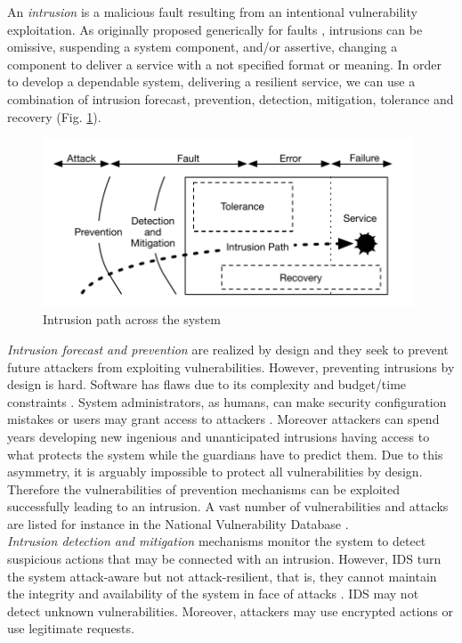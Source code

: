 An \emph{intrusion} is a malicious fault resulting from an intentional vulnerability exploitation. As originally proposed generically for faults \cite{Aviz,Powell1992}, intrusions can be omissive, suspending a system component, and/or assertive, changing a component to deliver a service with a not specified format or meaning. In order to develop a dependable system, delivering a resilient service, we can use a combination of intrusion forecast, prevention, detection, mitigation, tolerance and recovery (Fig. \ref{fig:intrusion_path}). \\

\begin{figure}
\centering
\includegraphics[width=110mm]{images/intrusion}
\caption{Intrusion path across the system}
\label{fig:intrusion_path}
\end{figure}

\emph{Intrusion forecast and prevention} are realized by design and they seek to prevent future attackers from exploiting vulnerabilities. However, preventing intrusions by design is hard. Software has flaws due to its complexity and budget/time constraints \cite{Charette2005,Landwehr1992}. System administrators, as humans, can make security configuration mistakes or users may grant access to attackers \cite{Brown2001}. Moreover attackers can spend years developing new ingenious and unanticipated intrusions having access to what protects the system while the guardians have to predict them. Due to this asymmetry, it is arguably impossible to protect all vulnerabilities by design. Therefore the vulnerabilities of prevention mechanisms can be exploited successfully leading to an intrusion. A vast number of vulnerabilities and attacks are listed for instance in the National Vulnerability Database \cite{nistNVD}.\\

\emph{Intrusion detection and mitigation} mechanisms monitor the system to detect suspicious actions that may be connected with an intrusion. However, \acf{IDS} turn the system attack-aware but not attack-resilient, that is, they cannot maintain the integrity and availability of the system in face of attacks \cite{Ammann2002}. \acf{IDS} may not detect unknown vulnerabilities. Moreover, attackers may use encrypted actions or use legitimate requests.\\

